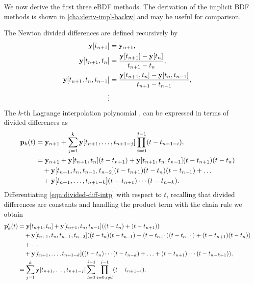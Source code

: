 We now derive the first three eBDF methods.
The derivation of the implicit BDF methods is shown in \autoref{cha:deriv-impl-backw} and may be useful for comparison.

The Newton divided differences are defined recursively by
\begin{equation}
  \label{eqn:divided-diff}
  \begin{aligned}
    \mathbf{y}[t_{n+1}] &= \mathbf{y}_{n+1}, \\
    \mathbf{y}[t_{n+1}, t_n] &= \frac{\mathbf{y}[t_{n+1}] - \mathbf{y}[t_n]}{t_{n+1} - t_n}, \\
    \mathbf{y}[t_{n+1}, t_n, t_{n-1}] &= \frac{\mathbf{y}[t_{n+1}, t_n] - \mathbf{y}[t_n, t_{n-1}]}{t_{n+1} - t_{n-1}}, \\
    \vdots
  \end{aligned}
\end{equation} 
The $k$-th Lagrange interpolation polynomial \cite[124]{BurdenFaires}, \cite[400]{HairerNorsettWanner} can be expressed in terms of divided differences as
\begin{equation}
  \label{eqn:divided-diff-intp}
  \begin{aligned}
    {\mathbf{p}}_k(t) &= \mathbf{y}_{n+1} + \sum_{j=1}^k \mathbf{y}[t_{n+1}, \ldots, t_{n+1-j}] \prod_{i=0}^{j-1} (t - t_{n+1-i}), \\
    &= \mathbf{y}_{n+1} + \mathbf{y}[t_{n+1}, t_n](t - t_{n+1}) + \mathbf{y}[t_{n+1}, t_n, t_{n-1}](t - t_{n+1})(t - t_n) \\
    &\quad + \mathbf{y}[t_{n+1}, t_n, t_{n-1}, t_{n-2}](t - t_{n+1})(t - t_n)(t - t_{n-1}) + \ldots \\
    &\quad + \mathbf{y}[t_{n+1}, \ldots, t_{n+1-k}](t-t_{n+1})\cdots(t-t_{n-k}).
  \end{aligned}
\end{equation}
Differentiating \eqref{eqn:divided-diff-intp} with respect to $t$, recalling that divided differences are constants and handling the product term with the chain rule we obtain
\begin{equation}
  \begin{aligned}
    {\mathbf{p}}_k'(t) &= \mathbf{y}[t_{n+1}, t_n] + \mathbf{y}[t_{n+1}, t_n, t_{n-1}]{\left( (t - t_n) + (t - t_{n+1}) \right)} \\
    &\quad + \mathbf{y}[t_{n+1}, t_n, t_{n-1}, t_{n-2}]{\left( (t - t_n)(t - t_{n-1}) + (t - t_{n+1})(t - t_{n-1}) + (t - t_{n+1})(t - t_n) \right)} \\
    &\quad + \ldots \\
    &\quad + \mathbf{y}[t_{n+1}, \ldots, t_{n+1-k}]{\left( (t-t_{n})\cdots(t-t_{n-k}) + \ldots + (t-t_{n+1})\cdots(t-t_{n-k+1}) \right)}, \\
    &= \sum_{j=1}^k \mathbf{y}[t_{n+1}, \ldots, t_{n+1-j}] \sum_{l=0}^{j-1} \prod_{i=0, i \neq l}^{j-1} (t - t_{n+1-i}).
    \label{eq:59}
  \end{aligned}
\end{equation} 
